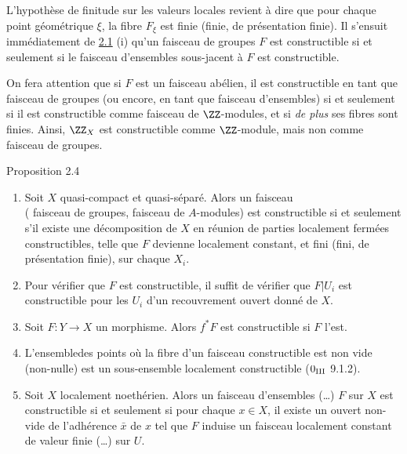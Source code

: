 \documentclass[10pt]{../fichiers-configuration-latex/smfart}
\begin{document}
\setcounter{subsection}{3}
\subsubsection{}
L'hypothèse de finitude sur les valeurs locales revient à dire que
pour chaque point géométrique $\xi$, la fibre $F_{\xi}$ est finie
(\resp finie, \resp de présentation finie). Il s'ensuit immédiatement
de \hyperref[IX.lem2.1]{2.1} (i) qu'un faisceau de groupes $F$ est constructible si et
seulement si le faisceau d'ensembles sous-jacent à $F$ est
constructible.

On fera attention que si $F$ est un faisceau abélien, il est
constructible en tant que faisceau de groupes (ou encore, en tant que
faisceau d'ensembles) si et seulement si il est constructible comme
faisceau de $\ZZ$-modules, et si \emph{de plus} ses
fibres sont finies. Ainsi, $\ZZ_X$ est
constructible comme $\ZZ$-module, mais non comme
faisceau de groupes.

\begin{enonce*}{Proposition 2.4}
\begin{enumerate}
\renewcommand{\theenumi}{\roman{enumi}}
\renewcommand{\labelenumi}{(\theenumi)}
\item Soit $X$ quasi-compact et quasi-séparé. Alors un faisceau \\ (\resp
  faisceau de groupes, \resp faisceau de $A$-modules) est
  constructible si et seulement s'il existe une décomposition de $X$
  en réunion de parties localement fermées constructibles, telle que
  $F$ devienne localement constant, et fini (\resp fini, \resp de
  présentation finie), sur chaque $X_i$.

\item Pour vérifier que $F$ est constructible, il suffit de vérifier
  que $F| U_i$ est constructible pour les $U_i$ d'un recouvrement
  ouvert donné de $X$.

\item Soit $F:Y\rightarrow X$ un morphisme. Alors $f^{\ast}F$ est
  constructible si $F$ l'est.

\item L'ensemble\pageoriginale des points où la fibre d'un faisceau
  constructible est non vide (\resp non-nulle) est un sous-ensemble
  localement constructible {\rm (\EGA $0_{\rm III}$ 9.1.2)}.

\item Soit $X$ localement noethérien. Alors un faisceau d'ensembles
  (\resp\ldots) $F$ sur $X$ est constructible si et seulement si pour
  chaque $x\in X$, il existe un ouvert non-vide de l'adhérence
  $\bar{x}$ de $x$ tel que $F$ induise un faisceau localement constant
  de valeur finie (\resp\ldots) sur $U$.
\end{enumerate}
\end{enonce*}
\end{document}
